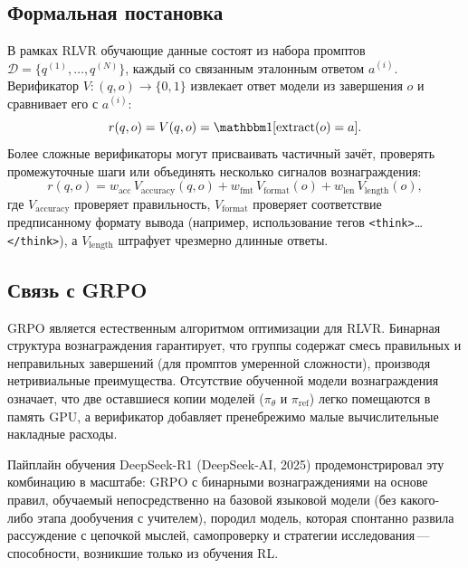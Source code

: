 \subsection{Формальная постановка}

В рамках RLVR обучающие данные состоят из набора промптов $\mathcal{D} = \{q^{(1)}, \ldots, q^{(N)}\}$, каждый со связанным эталонным ответом $a^{(i)}$. Верификатор $V: (q, o) \to \{0, 1\}$ извлекает ответ модели из завершения $o$ и сравнивает его с $a^{(i)}$:
\begin{equation}
\label{eq:rlvr-reward}
r(q, o) = V(q, o) = \ind[\text{extract}(o) = a].
\end{equation}
Более сложные верификаторы могут присваивать частичный зачёт, проверять промежуточные шаги или объединять несколько сигналов вознаграждения:
\begin{equation}
\label{eq:rlvr-composite}
r(q, o) = w_\mathrm{acc}\, V_\mathrm{accuracy}(q, o) + w_\mathrm{fmt}\, V_\mathrm{format}(o) + w_\mathrm{len}\, V_\mathrm{length}(o),
\end{equation}
где $V_\mathrm{accuracy}$ проверяет правильность, $V_\mathrm{format}$ проверяет соответствие предписанному формату вывода (например, использование тегов \texttt{<think>}\ldots\texttt{</think>}), а $V_\mathrm{length}$ штрафует чрезмерно длинные ответы.

\subsection{Связь с GRPO}

GRPO является естественным алгоритмом оптимизации для RLVR. Бинарная структура вознаграждения гарантирует, что группы содержат смесь правильных и неправильных завершений (для промптов умеренной сложности), производя нетривиальные преимущества. Отсутствие обученной модели вознаграждения означает, что две оставшиеся копии моделей ($\pi_\theta$ и $\pi_\mathrm{ref}$) легко помещаются в память GPU, а верификатор добавляет пренебрежимо малые вычислительные накладные расходы.

Пайплайн обучения DeepSeek-R1 (DeepSeek-AI, 2025) продемонстрировал эту комбинацию в масштабе: GRPO с бинарными вознаграждениями на основе правил, обучаемый непосредственно на базовой языковой модели (без какого-либо этапа дообучения с учителем), породил модель, которая спонтанно развила рассуждение с цепочкой мыслей, самопроверку и стратегии исследования\,---\,способности, возникшие только из обучения RL.

